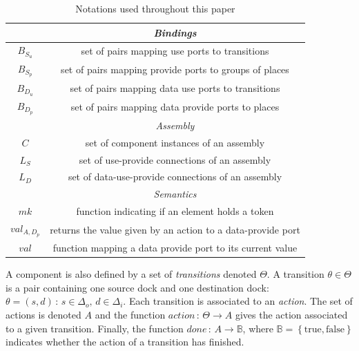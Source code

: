 {\begin{table}[tp]
{\begin{tabular}{|c|c|}
      \hline
      \hline
      & \emph{Bindings}\\
      \hline
      $B_{S_{u}}$ & set of pairs mapping use ports to transitions\\
      $B_{S_{p}}$ & set of pairs mapping provide ports to groups of places\\
      $B_{D_{u}}$ & set of pairs mapping data use ports to transitions\\
      $B_{D_{p}}$ & set of pairs mapping data provide ports to places\\
      \hline
      \hline
      & \emph{Assembly}\\
      \hline
      $C$ & set of component instances of an assembly\\
      $L_S$ & set of use-provide connections of an assembly\\
      $L_D$ & set of data-use-provide connections of an assembly\\
      \hline
      \hline
      & \emph{Semantics}\\
      \hline
      $mk$ & function indicating if an element holds a token\\
      $val_{A,D_p}$ & returns the value given by an action to a data-provide port\\
      $val$ & function mapping a data provide port to its current value\\
      \hline
    \end{tabular}
  }
  \caption{Notations used throughout this paper}
  \label{tab:not}
\end{table}
A component is also defined by a set of \emph{transitions} denoted
$\Theta$. A transition $\theta \in \Theta$ is a pair containing one
source dock and one destination dock: $\theta =
\left(s,d\right)\,:\,s\in\Delta_{o},\,d\in\Delta_{i}$. 
%
Each transition is associated to an \emph{action}. The set of actions is
denoted $A$ and the function $action\,:\,\Theta\rightarrow A$ gives the action
associated to a given transition. Finally, the function
$done\,:\,A\rightarrow\mathbb{B}$, where $\mathbb{B}=\left\{
\text{true},\text{false}\right\}$ indicates whether the action of a
transition has finished.
  
}

